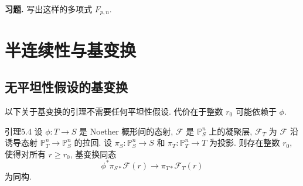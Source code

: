 \textbf{习题.} 写出这样的多项式 $F_{p,n}$.
\section{半连续性与基变换}\label{ch05:sec5.3}
\subsection{无平坦性假设的基变换}\label{ch05:sec5.3.1}
以下关于基变换的引理不需要任何平坦性假设. 代价在于整数 $r_0$ 可能依赖于 $\phi$.

\begin{origstatement}{引理}{5.4}\label{ch05:lem5.4}
设 $\phi:T\to S$ 是 Noether 概形间的态射, $\mathcal F$ 是 $\mathbb P^n_S$ 上的凝聚层, $\mathcal F_T$ 为 $\mathcal F$ 沿诱导态射 $\mathbb P^n_T\to\mathbb P^n_S$ 的拉回. 设 $\pi_S:\mathbb P^n_S\to S$ 和 $\pi_T:\mathbb P^n_T\to T$ 为投影. 则存在整数 $r_0$, 使得对所有 $r\geq r_0$, 基变换同态
\[
 \phi^*\pi_{S*}\mathcal F(r)\longrightarrow\pi_{T*}\mathcal F_T(r)
\]
为同构.
\end{origstatement}
